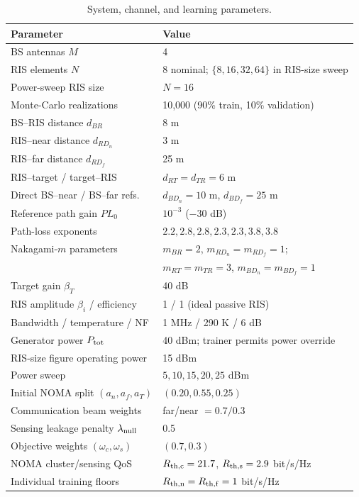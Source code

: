 \begin{table}[t]
\centering
\caption{System, channel, and learning parameters.}
\label{tab:sim}
\scriptsize
\begin{tabular}{@{}ll@{}}
\toprule
Parameter & Value \\ \midrule
BS antennas $M$ & 4 \\
RIS elements $N$ & 8 nominal; $\{8,16,32,64\}$ in RIS-size sweep \\
Power-sweep RIS size & $N=16$ \\
Monte-Carlo realizations & 10,000 (90\% train, 10\% validation) \\
BS--RIS distance $d_{BR}$ & 8 m \\
RIS--near distance $d_{RD_n}$ & 3 m \\
RIS--far distance $d_{RD_f}$ & 25 m \\
RIS--target / target--RIS & $d_{RT}=d_{TR}=6$ m \\
Direct BS--near / BS--far refs. & $d_{BD_n}=10$ m, $d_{BD_f}=25$ m \\
Reference path gain $PL_0$ & $10^{-3}$ ($-30$ dB) \\
Path-loss exponents & $2.2,2.8,2.8,2.3,2.3,3.8,3.8$ \\
Nakagami-$m$ parameters & $m_{BR}=2$, $m_{RD_n}=m_{RD_f}=1$; \\
 & $m_{RT}=m_{TR}=3$, $m_{BD_n}=m_{BD_f}=1$ \\
Target gain $\beta_T$ & 40 dB \\
RIS amplitude $\beta_i$ / efficiency & 1 / 1 (ideal passive RIS) \\
Bandwidth / temperature / NF & 1 MHz / 290 K / 6 dB \\
Generator power $P_{\rm tot}$ & 40 dBm; trainer permits power override \\
RIS-size figure operating power & 15 dBm \\
Power sweep & $5,10,15,20,25$ dBm \\
Initial NOMA split $(a_n,a_f,a_T)$ & $(0.20,0.55,0.25)$ \\
Communication beam weights & far/near $=0.7/0.3$ \\
Sensing leakage penalty $\lambda_{\rm null}$ & 0.5 \\
Objective weights $(\omega_c,\omega_s)$ & $(0.7,0.3)$ \\
NOMA cluster/sensing QoS & $R_{\rm th,c}=21.7$, $R_{\rm th,s}=2.9$ bit/s/Hz \\
Individual training floors & $R_{\rm th,n}=R_{\rm th,f}=1$ bit/s/Hz \\

\end{tabular}
\end{table}
